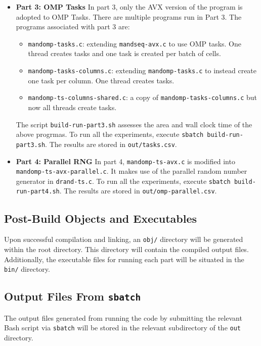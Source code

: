 \documentclass{article}
\begin{document}
\begin{itemize}
    \item \textbf{Part 3: OMP Tasks}
    In part 3, only the AVX version of the program is adopted to OMP Tasks. There are multiple programs run in Part 3. The programs associated with part 3 are:
    \begin{itemize}
        \item \texttt{mandomp-tasks.c}: extending \texttt{mandseq-avx.c} to use OMP tasks. One thread creates tasks and one task is created per batch of cells. 
        \item \texttt{mandomp-tasks-columns.c}: extending \texttt{mandomp-tasks.c} to instead create one task per column. One thread creates tasks.
        \item \texttt{mandomp-ts-columns-shared.c}: a copy of \texttt{mandomp-tasks-columns.c} but now all threads create tasks.
    \end{itemize}
    The script \texttt{build-run-part3.sh} assesses the area and wall clock time of the above progrmas. 
    To run all the experiments, execute \texttt{sbatch build-run-part3.sh}. The results are stored in \texttt{out/tasks.csv}.

    \item \textbf{Part 4: Parallel RNG}
    In part 4, \texttt{mandomp-ts-avx.c} is modified into \texttt{mandomp-ts-avx-parallel.c}. It makes use of the parallel random 
    number generator in \texttt{drand-ts.c}.
    To run all the experiments, execute \texttt{sbatch build-run-part4.sh}. The results are stored in \texttt{out/omp-parallel.csv}. 
\end{itemize}

\subsection{Post-Build Objects and Executables}
Upon successful compilation and linking, an \texttt{obj/} directory will be generated within the root directory. 
This directory will contain the compiled output files. Additionally, the executable files for running each part will be 
situated in the \texttt{bin/} directory.

\subsection{Output Files From \texttt{sbatch}}
The output files generated from running the code by submitting the relevant Bash script via \texttt{sbatch} will be 
stored in the relevant subdirectory of the \texttt{out} directory. 
\end{document}
